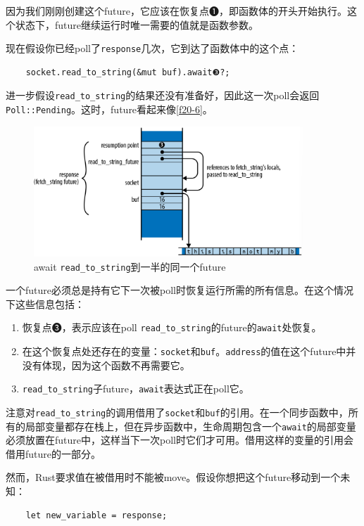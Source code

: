 因为我们刚刚创建这个future，它应该在恢复点❶，即函数体的开头开始执行。这个状态下，future继续运行时唯一需要的值就是函数参数。

现在假设你已经poll了\texttt{response}几次，它到达了函数体中的这个点：
\begin{verbatim}
    socket.read_to_string(&mut buf).await❸?;
\end{verbatim}

进一步假设\texttt{read\_to\_string}的结果还没有准备好，因此这一次poll会返回\texttt{Poll::Pending}。这时，future看起来像\autoref{f20-6}。

\begin{figure}
    \centering
    \includegraphics[width=0.9\textwidth]{../img/f20-6.png}
    \caption{await \texttt{read\_to\_string}到一半的同一个future}
    \label{f20-6}
\end{figure}

一个future必须总是持有它下一次被poll时恢复运行所需的所有信息。在这个情况下这些信息包括：
\begin{enumerate}
    \item 恢复点❸，表示应该在poll \texttt{read\_to\_string}的future的\texttt{await}处恢复。
    \item 在这个恢复点处还存在的变量：\texttt{socket}和\texttt{buf}。\texttt{address}的值在这个future中并没有体现，因为这个函数不再需要它。
    \item \texttt{read\_to\_string}子future，\texttt{await}表达式正在poll它。
\end{enumerate}

注意对\texttt{read\_to\_string}的调用借用了\texttt{socket}和\texttt{buf}的引用。在一个同步函数中，所有的局部变量都存在栈上，但在异步函数中，生命周期包含一个\texttt{await}的局部变量必须放置在future中，这样当下一次poll时它们才可用。借用这样的变量的引用会借用future的一部分。

然而，Rust要求值在被借用时不能被move。假设你想把这个future移动到一个未知：
\begin{verbatim}
    let new_variable = response;
\end{verbatim}

